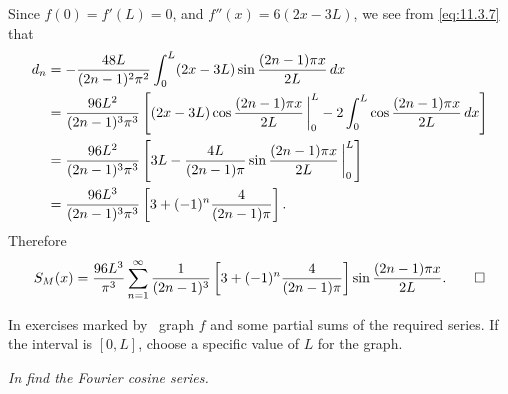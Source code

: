 \begin{solution}
Since $f(0)=f'(L)=0$, and $f''(x)=6(2x-3L)$, we see from \eqref{eq:11.3.7}
that
\begin{align*}
d_n&=-\frac{48L}{(2n-1)^2\pi^2}\int_0^L(2x-3L)
\sin\frac{(2n-1)\pi x}{2L}\,dx\\
&=\frac{96L^2}{(2n-1)^3\pi^3}\left[(2x-3L)\cos\frac{(2n-1)\pi
x}{2L}\,\bigg|_{0}^{L}-2\int_0^L\cos\frac{(2n-1)\pi x}{2L}\,dx\right]\\
&=\frac{96L^2}{(2n-1)^3\pi^3}\left[3L-\frac{4L}{(2n-1)\pi}
\sin\frac{(2n-1)\pi x}{2L}\,\bigg|_{0}^{L}\right]\\
&=\frac{96L^3}{(2n-1)^3\pi^3}\left[3+(-1)^n\frac{4}{(2n-1)\pi}\right].
\end{align*}
Therefore
\[
S_M(x)
=\frac{96L^3}{\pi^3}\sum_{n=1}^\infty
\frac{1}{(2n-1)^3}\left[3+(-1)^n\frac{4}{(2n-1)\pi}\right]\sin\frac{(2n-1)\pi
x}{2L}.\qedhere
\]
\end{solution}

\exercises

In exercises marked by \Cex\, graph $f$
and some partial sums of the required series. If the interval
is $[0,L]$, choose a specific value of $L$ for the graph.

\emph{In  find the Fourier
cosine series.}

